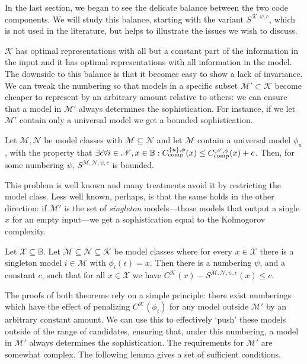 \documentclass{style/llncs}
\newcommand{\M}{\mathscr M}
\newcommand{\K}{\mathscr K}
\newcommand{\X}{\mathscr X}
\newcommand{\B}{\mathbb B}
\newcommand{\Nm}{\mathscr N}
\newcommand{\tn}[1]{\textnormal{#1}}
\newcommand{\Cc}{C_\tn{comp}}
\begin{document}
In the last section, we began to see the delicate balance between the two code components. We will study this balance, starting with the variant $S^{\K,\psi,c}$, which is not used in the literature, but helps to illustrate the issues we wish to discuss.

$\K$ has optimal representations with all but a constant part of the information in the input and it has optimal representations with all information in the model. The downside to this balance is that it becomes easy to show a lack of invariance. We can tweak the numbering so that models in a specific subset $\M'\subset\K$ become cheaper to represent by an arbitrary amount relative to others: we can ensure that a model in $\M'$ always determines the sophistication. For instance, if we let $\M'$ contain only a universal model we get a bounded sophistication.

\begin{theorem}[Underfitting]
Let $\M, \Nm$ be model classes with $\M \subseteq \Nm$ and let $\M$ contain a universal model $\phi_u$, with the property that $\exists c \forall i \in \Nm, x \in \B : \Cc^{\{u\},\phi}(x) \leq \Cc^{\Nm, \phi}(x)+ c$. Then, for some numbering $\psi$, $S^{\M,\Nm, \psi,c}$ is bounded. \label{theorem:underfitting}
\end{theorem}
This problem is well known and many treatments avoid it by restricting the model class. Less well known, perhaps, is that the same holds in the other direction:  if $\M'$ is the set of \emph{singleton} models---those models that output a single $x$ for an empty input---we get a sophistication equal to the Kolmogorov complexity.

\begin{theorem}[Overfitting]
Let $\X \subseteq \B$. Let $\M \subseteq \Nm \subseteq \K$ be model classes where for every $x\in\X$ there is a singleton model $i\in\M$ with $\phi_i(\epsilon)=x$. Then there is a numbering $\psi$, and a constant $c$, such that for all $x\in\X$ we have $C^\K(x)-S^{\M,\Nm,\psi,c}(x) \leq c$.\label{theorem:overfitting}
\end{theorem}
The proofs of both theorems rely on a simple principle: there exist numberings which have the effect of penalizing $C^\K(\phi_i)$ for any model outside $\M'$ by an arbitrary constant amount. We can use this to effectively `push' these models outside of the range of candidates, ensuring that, under this numbering, a model in $\M'$ always determines the sophistication. The requirements for $\M'$ are somewhat complex. The following lemma gives a set of sufficient conditions.
\end{document}

